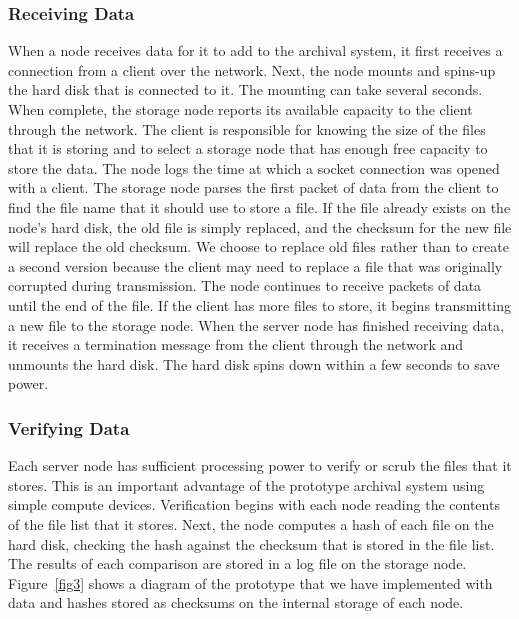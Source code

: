 \subsubsection{Receiving Data}
When a node receives data for it to add to the archival system, it first receives a connection from a client over the network.  Next, the node mounts and spins-up the hard disk that is connected to it.  The mounting can take several seconds.  When complete, the storage node reports its available capacity to the client through the network.  The client is responsible for knowing the size of the files that it is storing and to select a storage node that has enough free capacity to store the data.  The node logs the time at which a socket connection was opened with a client.  The storage node parses the first packet of data from the client to find the file name that it should use to store a file.  If the file already exists on the node's hard disk, the old file is simply replaced, and the checksum for the new file will replace the old checksum.  We choose to replace old files rather than to create a second version because the client may need to replace a file that was originally corrupted during transmission.  The node continues to receive packets of data until the end of the file.  If the client has more files to store, it begins transmitting a new file to the storage node.  When the server node has finished receiving data, it receives a termination message from the client through the network and unmounts the hard disk.  The hard disk spins down within a few seconds to save power.

\subsubsection{Verifying Data}
Each server node has sufficient processing power to verify or scrub the files that it stores.  This is an important advantage of the prototype archival system using simple compute devices.  Verification begins with each node reading the contents of the file list that it stores.  Next, the node computes a hash of each file on the hard disk, checking the hash against the checksum that is stored in the file list.  The results of each comparison are stored in a log file on the storage node.  Figure~\ref{fig3} shows a diagram of the prototype that we have implemented with data and hashes stored as checksums on the internal storage of each node.

